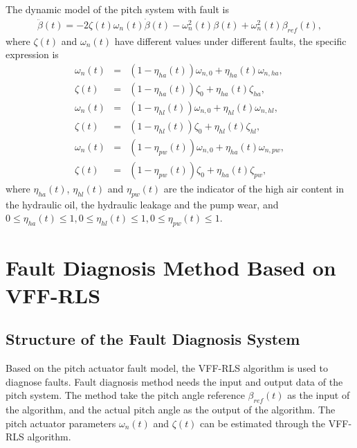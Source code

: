 \documentclass{article}
\begin{document}
The dynamic model of the pitch system with fault is
\begin{eqnarray}
  \ddot{\beta}(t) = -2\zeta(t)\omega_n(t)\dot{\beta}(t) - \omega^2_n(t)\beta(t) + \omega^2_n(t)\beta_{ref}(t),   \label{eq:2}
\end{eqnarray}
where $\zeta(t)$ and $\omega_n(t)$ have different values under different faults, the specific
expression is
\begin{eqnarray}
  \omega_n(t) &=& (1-\eta_{ha}(t))\omega_{n,0}  + \eta_{ha}(t)\omega_{n,ha},    \label{eq:3}\\
  \zeta(t)    &=& (1-\eta_{ha}(t))\zeta_0       + \eta_{ha}(t)\zeta_{ha},       \label{eq:4}\\
  \omega_n(t) &=& (1-\eta_{hl}(t))\omega_{n,0}  + \eta_{hl}(t)\omega_{n,hl},    \label{eq:5}\\
  \zeta(t)    &=& (1-\eta_{hl}(t))\zeta_0       + \eta_{hl}(t)\zeta_{hl},       \label{eq:6}\\
  \omega_n(t) &=& (1-\eta_{pw}(t))\omega_{n,0}  + \eta_{ha}(t)\omega_{n,pw},    \label{eq:7}\\
  \zeta(t)    &=& (1-\eta_{pw}(t))\zeta_0       + \eta_{ha}(t)\zeta_{pw},       \label{eq:8}
\end{eqnarray}
where $\eta_{ha}(t)$, $\eta_{hl}(t)$ and $\eta_{pw}(t)$ are the indicator of the
high air content in the hydraulic oil, the hydraulic leakage and the pump wear, and
$0\leq\eta_{ha}(t)\leq1, 0\leq\eta_{hl}(t)\leq1, 0\leq\eta_{pw}(t)\leq1$.







\section{Fault Diagnosis Method Based on VFF-RLS }

\subsection{Structure of the Fault Diagnosis System}

Based on the pitch actuator fault model, the VFF-RLS algorithm is used to
diagnose faults. Fault diagnosis method needs the input
and output data of the pitch system. The method take the pitch angle reference $\beta_{ref}(t)$
as the input of the algorithm,
and the actual pitch angle
as the output of the algorithm.  The pitch actuator
parameters $\omega_n(t)$ and $\zeta(t)$ can be estimated through the VFF-RLS algorithm.
\end{document}
